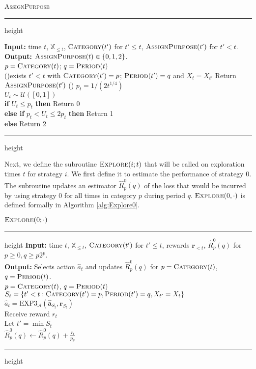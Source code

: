 \documentclass[aos]{imsart}
\theoremstyle{plain}
\theoremstyle{remark}
\newcommand{\Acal}{\mathcal{A}}
\newcommand{\Ucal}{\mathcal{U}}
\newcommand{\Xbb}{\mathbb{X}}
\newcommand{\1}{\mathbbm{1}}%
\newcommand{\mb}[1]{\ensuremath{\boldsymbol{#1}}}
\newcommand{\EXP}{\mathrm{EXP3}}
\begin{document}
\begin{algorithm}
\caption{\textsc{AssignPurpose}}\label{alg:AssignPurpose}
\hrule height\algoheightrule\kern3pt\relax

\textbf{Input:} time $t$, $\Xbb_{\leq t}$, $\textsc{Category}(t')$ for $t'\leq t$, $\textsc{AssignPurpose}(t')$ for $t'<t$.\\
\textbf{Output:} $\textsc{AssignPurpose}(t)\in\{0,1,2\}$.\\

$p= \textsc{Category}(t)$; $q=\textsc{Period}(t)$\\
\uIf(){exists $t'<t$ with $ \textsc{Category}(t')=p$; $\textsc{Period}(t')=q$ and $X_t=X_{t'}$}{
    Return $\textsc{AssignPurpose}(t')$
}
\Else(){
    $p_t = 1/(2t^{1/4})$\\
    $U_t \sim\Ucal([0,1])$\\
    \textbf{if} $U_t\leq p_t$ \textbf{then} Return 0 \\
    \textbf{else if} $p_t<U_t\leq 2p_t$ \textbf{then} Return 1 \\
    \textbf{else} Return 2 
}
\hrule height\algoheightrule\kern3pt\relax
\end{algorithm}

Next, we define the subroutine $\textsc{Explore}(i;t)$ that will be called on exploration times $t$ for strategy $i$. We first define it to estimate the performance of strategy 0. The subroutine updates an estimator $\hat R_p^0(q)$ of the loss that would be incurred by using strategy 0 for all times in category $p$ during period $q$. $\textsc{Explore}(0,\cdot)$ is defined formally in Algorithm \ref{alg:Explore0}.

\begin{algorithm}
\caption{$\textsc{Explore}(0;\cdot)$}\label{alg:Explore0}
\hrule height\algoheightrule\kern3pt\relax
\textbf{Input:} time $t$, $\Xbb_{\leq t}$, $\textsc{Category}(t')$ for $t'\leq t$, rewards $\mb r_{<t}$, $\hat R_p^0(q)$ for $p\geq 0,q\geq p2^p$.\\
\textbf{Output:} Selects action $\hat a_t$ and updates $\hat R_p^0(q)$ for $p= \textsc{Category}(t)$, $q=\textsc{Period}(t)$.\\

$p= \textsc{Category}(t)$, $q=\textsc{Period}(t)$\\
$S_t = \{t'<t:\textsc{Category}(t') = p, \textsc{Period}(t')=q, X_{t'}=X_t\}$\\
$\hat a_t = \EXP_{\Acal}(\mb{\hat a}_{S_t}, \mb r_{S_t})$\\
Receive reward $r_t$\\
 Let  $t'=\min S_t$ \\
$\hat R_p^0(q)\gets \hat R_p^0(q) + \frac{r_t}{p_{t'}}$ 

\hrule height\algoheightrule\kern3pt\relax
\end{algorithm}
\end{document}
